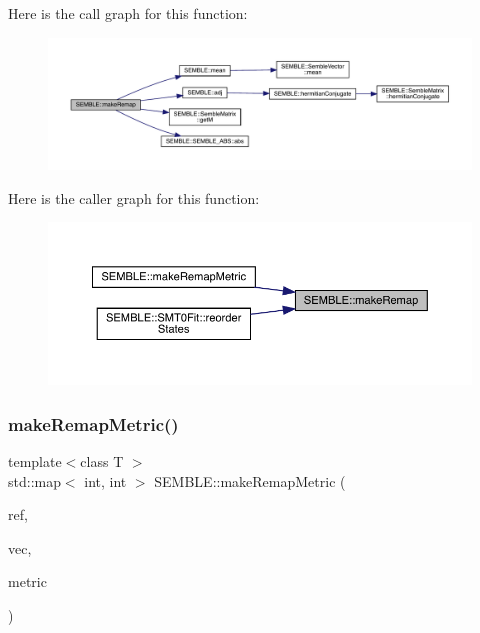 Here is the call graph for this function\+:
\nopagebreak
\begin{figure}[H]
\begin{center}
\leavevmode
\includegraphics[width=350pt]{d7/dfd/namespaceSEMBLE_a7cb9cde2b51fb036476a01f5a37bf15c_cgraph}
\end{center}
\end{figure}
Here is the caller graph for this function\+:
\nopagebreak
\begin{figure}[H]
\begin{center}
\leavevmode
\includegraphics[width=350pt]{d7/dfd/namespaceSEMBLE_a7cb9cde2b51fb036476a01f5a37bf15c_icgraph}
\end{center}
\end{figure}
\mbox{\label{namespaceSEMBLE_a487d1e90c43dcb23f1d3eecb8f98376c}} 
\subsubsection{\texorpdfstring{makeRemapMetric()}{makeRemapMetric()}}
{\footnotesize\ttfamily template$<$class T $>$ \\
std\+::map$<$ int, int $>$ S\+E\+M\+B\+L\+E\+::make\+Remap\+Metric (\begin{DoxyParamCaption}\item[{const \mbox{\hyperlink{structSEMBLE_1_1SembleMatrix}{Semble\+Matrix}}$<$ T $>$ \&}]{ref,  }\item[{const \mbox{\hyperlink{structSEMBLE_1_1SembleMatrix}{Semble\+Matrix}}$<$ T $>$ \&}]{vec,  }\item[{const \mbox{\hyperlink{structSEMBLE_1_1SembleMatrix}{Semble\+Matrix}}$<$ T $>$ \&}]{metric }\end{DoxyParamCaption})}


